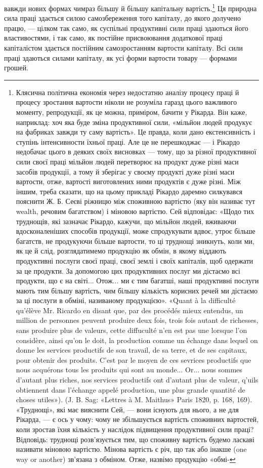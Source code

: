 вавжди нових формах чимраз більшу й більшу капітальну вартість.\footnote{
Клясична політична економія через недостатню аналізу процесу
праці й процесу зростання вартости ніколи не розуміла гаразд цього
важливого моменту, репродукції, як це можна, приміром, бачити у Рікарда.
Він каже, наприклад: хоч яка буде зміна продуктивної сили,
«мільйон людей продукує на фабриках завжди ту саму вартість». Це
правда, коли дано екстенсивність і ступінь інтенсивности їхньої праці.
Але це не перешкоджає — і Рікардо недобачає цього в деяких своїх висновках
— тому, що за різної продуктивної сили своєї праці мільйон людей
перетворює на продукт дуже різні маси засобів продукції, а тому й зберігає
у своєму продукті дуже різні маси вартости, отже, вартості виготовлених
ними продуктів є дуже різні. Між іншим, треба сказати, що на цьому
прикладі Рікардо даремно силкувався пояснити Ж. Б. Сеєві ріжницю
між споживною вартістю (яку він називає тут wealth, речовим багатством)
і міновою вартістю. Сей відповідає: «Щодо тих труднощів, які
зазначає Рікардо, кажучи, що мільйон людей, вживаючи вдосконаленіших
способів продукції, може спродукувати вдвоє, утроє більше багатств,
не продукуючи більше вартости, то ці труднощі зникнуть, коли ми, як
це й слід, розглядатимемо продукцію як обмін, в якому віддають продуктивні
послуги своєї праці, своєї землі і своїх капіталів, щоб одержати
за це продукти. За допомогою цих продуктивних послуг ми дістаємо всі
продукти, що є на світі... Отож... ми є тим багатші, наші продуктивні
послуги мають тим більшу вартість, чим більшу кількість корисних
речей ми дістаємо за ці послуги в обміні, називаному продукцією».
«Quant à la difficulté qu’élève Mr. Ricardo en disant que, par des procédés
mieux entendus, un million de personnes peuvent produire deux fois,
trois fois autant de richesses, sans produire plus de valeurs, cette diffuculté
n’en est pas une lorsque l’on considère, ainsi qu’on le doit, la production
comme un échange dans lequel on donne les services productifs de son travail,
de sa terre, et de ses capitaux, pour obtenir des produits. C’est par
le moyen de ces sevrices productifs que nous acquérons tous les produits
qui sont au monde... Or... nous sommes d’autant plus riches, nos services
productifs ont d’autant plus de valeur, q’uils obtiennent dans l’échange
appelé production, une plus grande quantité de choses utiles»). (J. B. Sag:
«Lettres à M. Maithus» Paris 1820, p. 168, 169). «Труднощі», які має
вияснити Сей, — вони існують для нього, а не для Рікарда, — є ось у
чому: чому не збільшується вартість споживних вартостей, коли зростав
їхня кількість у наслідок підвищення продуктивної сили праці? Відповідь:
труднощі розв’язується тим, що споживну вартість будемо ласкаві
називати міновою вартістю. Мінова вартість є річ, що так або інакше
(one way or another) зв’язана з обміном. Отже, назвімо продукцію «обмі-
} Ця природна сила праці здається силою самозбереження
того капіталу, до якого долучено працю, — цілком так само,
як суспільні продуктивні сили праці здаються його властивостями,
і так само, як постійне присвоювання додаткової праці
капіталістом здається постійним самозростанням вартости капіталу.
Всі сили праці здаються силами капіталу, як усі форми
вартости товару — формами грошей.

